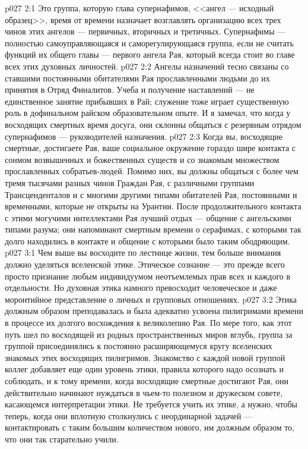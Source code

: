 \vs p027 2:1 Это группа, которую глава супернафимов, <<ангел --- исходный образец>>, время от времени назначает возглавлять организацию всех трех чинов этих ангелов --- первичных, вторичных и третичных. Супернафимы --- полностью самоуправляющаяся и саморегулирующаяся группа, если не считать функций их общего главы --- первого ангела Рая, который всегда стоит во главе всех этих духовных личностей.
\vs p027 2:2 Ангелы назначений тесно связаны со ставшими постоянными обитателями Рая прославленными людьми до их принятия в Отряд Финалитов. Учеба и получение наставлений --- не единственное занятие прибывших в Рай; служение тоже играет существенную роль в дофинальном райском образовательном опыте. И я замечал, что когда у восходящих смертных время досуга, они склонны общаться с резервным отрядом супернафимов --- руководителей назначения.
\vs p027 2:3 Когда вы, восходящие смертные, достигаете Рая, ваше социальное окружение гораздо шире контакта с сонмом возвышенных и божественных существ и со знакомым множеством прославленных собратьев\hyp{}людей. Помимо них, вы должны общаться с более чем тремя тысячами разных чинов Граждан Рая, с различными группами Трансценденталов и с многими другими типами обитателей Рая, постоянными и временными, которые не открыты на Урантии. После продолжительного контакта с этими могучими интеллектами Рая лучший отдых --- общение с ангельскими типами разума; они напоминают смертным времени о серафимах, с которыми так долго находились в контакте и общение с которыми было таким ободряющим.
\vs p027 3:1 Чем выше вы восходите по лестнице жизни, тем больше внимания должно уделяться вселенской этике. Этическое сознание --- это прежде всего просто признание любым индивидуумом неотъемлемых прав всех и каждого в отдельности. Но духовная этика намного превосходит человеческое и даже моронтийное представление о личных и групповых отношениях.
\vs p027 3:2 Этика должным образом преподавалась и была адекватно усвоена пилигримами времени в процессе их долгого восхождения к великолепию Рая. По мере того, как этот путь шел по восходящей из родных пространственных миров вглубь, группа за группой присоединялись к постоянно расширяющемуся кругу вселенских знакомых этих восходящих пилигримов. Знакомство с каждой новой группой коллег добавляет еще один уровень этики, правила которого надо осознать и соблюдать, и к тому времени, когда восходящие смертные достигают Рая, они действительно начинают нуждаться в чьем\hyp{}то полезном и дружеском совете, касающемся интерпретации этики. Не требуется учить их этике, а нужно, чтобы теперь, когда они вплотную столкнулись с неординарной задачей --- контактировать с таким большим количеством нового, им должным образом  то, что они так старательно учили.
